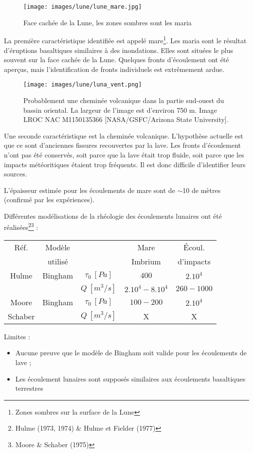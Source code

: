 \documentclass[10pt,a4paper, twocolumns]{article}
\begin{document}
\begin{figure}[!h]
	\centering
	\texttt{[image: images/lune/lune\_mare.jpg]} 
	\caption{Face cachée de la Lune, les zones sombres sont les maria}
\end{figure}

La première caractéristique identifiée est appelé mare\footnote{Zones sombres sur la surface de la Lune}. Les maria sont le résultat d'éruptions basaltiques similaires à des inondations. Elles sont situées le plus souvent sur la face cachée de la Lune. Quelques fronts d'écoulement ont été aperçus, mais l'identification de fronts individuels est extrêmement ardue.

\begin{figure}[!h]
	\centering
	\texttt{[image: images/lune/luna\_vent.png]}
	\caption{Probablement une cheminée volcanique dans la partie sud-ouest du bassin oriental. La largeur de l'image est d'environ 750 m. Image LROC NAC M1150135366 [NASA/GSFC/Arizona State University].}
\end{figure}

Une seconde caractéristique est la cheminée volcanique. L'hypothèse actuelle est que ce sont d'anciennes fissures recouvertes par la lave. Les fronts d'écoulement n'ont pas été conservés, soit parce que la lave était trop fluide, soit parce que les impacts météoritiques étaient trop fréquents. Il est donc difficile d'identifier leurs sources.

L'épaisseur estimée pour les écoulements de mare sont de $\sim$10 de mètres (confirmé par les expériences).

Différentes modélisations de la rhéologie des écoulements lunaires ont été réalisées\footnote{Hulme (1973, 1974) \& Hulme et Fielder (1977)}\footnote{Moore \& Schaber (1975)} :

\begin{table}[h]
	\centering
	\begin{tabular}{|c||c|c|c|c|}
		\hline
		Réf.      & Modèle  &                & Mare              & Écoul.\\
		          & utilisé &                & Imbrium           & d'impacts  \\
		\hline
		Hulme     & Bingham & $\tau_0\ [Pa]$ & $400$             & $2.10^4$\\
		          &         & $Q\ [m^3/s]$   & $2.10^4 - 8.10^4$ & $260 - 1000$\\
		\hline
		Moore     & Bingham & $\tau_0\ [Pa]$ & $100-200$         & $2.10^4$\\
		Schaber   &         & $Q\ [m^3/s]$   & X                 & X \\
		\hline
	\end{tabular}
\end{table}
Limites :
\begin{itemize}
	\item Aucune preuve que le modèle de Bingham soit valide pour les écoulements de lave ;
	\item Les écoulement lunaires sont supposés similaires aux écoulements basaltiques terrestres
\end{itemize}
\end{document}

